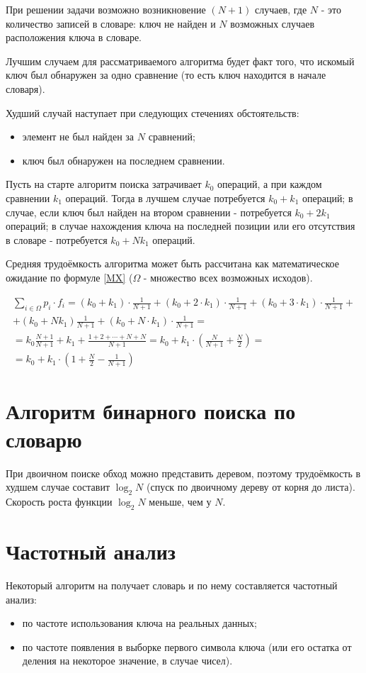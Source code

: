 \documentclass[12pt]{report}
\begin{document}
При решении задачи возможно возникновение $(N + 1)$ случаев, где $N$ - это количество записей в словаре: ключ не найден и $N$ возможных случаев расположения ключа в словаре.

Лучшим случаем для рассматриваемого алгоритма будет факт того, что искомый ключ был обнаружен за одно сравнение (то есть ключ находится в начале словаря).

Худший случай наступает при следующих стечениях обстоятельств:
\begin{itemize}
\item элемент не был найден за $N$ сравнений;
\item ключ был обнаружен на последнем сравнении.
\end{itemize}

Пусть на старте алгоритм поиска затрачивает $k_0$ операций, а при каждом сравнении $k_1$ операций. Тогда в лучшем случае потребуется $k_0 + k_1$ операций; в случае, если ключ был найден на втором сравнении - потребуется $k_0 + 2k_1$ операций; в случае нахождения ключа на последней позиции или его отсутствия в словаре - потребуется $k_0 + Nk_1$ операций.

Средняя трудоёмкость алгоритма может быть рассчитана как математическое ожидание по формуле \ref{MX} ($\Omega$ - множество всех возможных исходов).

\label{MX}
\begin{multline}
        \sum\limits_{i \in \Omega} p_i \cdot f_i = (k_0 + k_1) \cdot \frac{1}{N + 1} + (k_0 + 2 \cdot k_1) \cdot \frac{1}{N+1} + (k_0 + 3 \cdot k_1) \cdot \frac{1}{N + 1} + \\+ (k_0 + Nk_1)\frac{1}{N + 1} + (k_0 + N \cdot k_1) \cdot \frac{1}{N + 1} = \\= k_0\frac{N+1}{N+1}+k_1+\frac{1 + 2 + \cdots + N + N}{N + 1} = k_0 + k_1 \cdot \left(\frac{N}{N + 1} + \frac{N}{2}\right) =\\= k_0 + k_1 \cdot \left(1 + \frac{N}{2} - \frac{1}{N + 1}\right)
\end{multline}

\section{Алгоритм бинарного поиска по словарю}
При двоичном поиске обход можно представить деревом, поэтому трудоёмкость в худшем случае составит $\log_2N$ (спуск по двоичному дереву от корня до листа). Скорость роста функции $\log_2N$ меньше, чем у $N$.

\section{Частотный анализ}
Некоторый алгоритм на получает словарь и по нему составляется частотный анализ:
\begin{itemize}
\item по частоте использования ключа на реальных данных;
\item по частоте появления в выборке первого символа ключа (или его остатка от деления на некоторое значение, в случае чисел).
\end{itemize}
\end{document}
